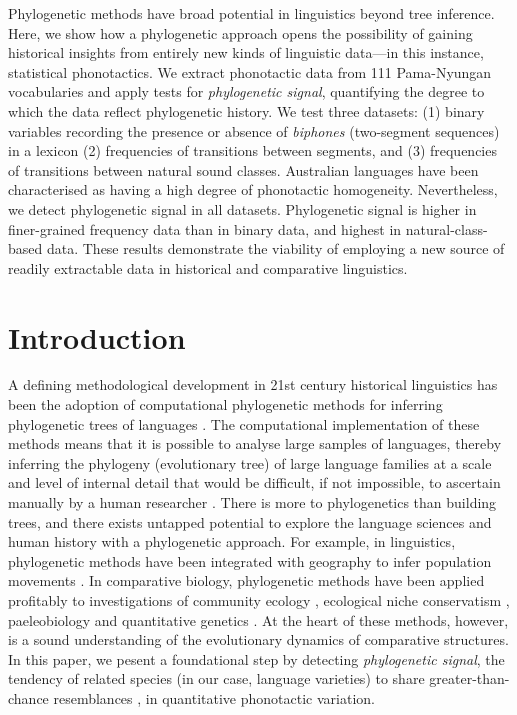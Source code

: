 Phylogenetic methods have broad potential in linguistics beyond tree inference. Here, we show how a phylogenetic approach opens the possibility of gaining historical insights from entirely new kinds of linguistic data---in this instance, statistical phonotactics. We extract phonotactic data from 111 Pama-Nyungan vocabularies and apply tests for \emph{phylogenetic signal}, quantifying the degree to which the data reflect phylogenetic history. We test three datasets: (1) binary variables recording the presence or absence of \emph{biphones} (two-segment sequences) in a lexicon (2) frequencies of transitions between segments, and (3) frequencies of transitions between natural sound classes. Australian languages have been characterised as having a high degree of phonotactic homogeneity. Nevertheless, we detect phylogenetic signal in all datasets. Phylogenetic signal is higher in finer-grained frequency data than in binary data, and highest in natural-class-based data. These results demonstrate the viability of employing a new source of readily extractable data in historical and comparative linguistics.

\hypertarget{phy-sig-intro}{%
\section{Introduction}\label{phy-sig-intro}}

A defining methodological development in 21st century historical linguistics has been the adoption of computational phylogenetic methods for inferring phylogenetic trees of languages \autocite{bowern_computational_2018}. The computational implementation of these methods means that it is possible to analyse large samples of languages, thereby inferring the phylogeny (evolutionary tree) of large language families at a scale and level of internal detail that would be difficult, if not impossible, to ascertain manually by a human researcher \autocite[p.~827]{bowern_computational_2012}. There is more to phylogenetics than building trees, and there exists untapped potential to explore the language sciences and human history with a phylogenetic approach. For example, in linguistics, phylogenetic methods have been integrated with geography to infer population movements \autocites{walker_bayesian_2011}{bouckaert_origin_2018}. In comparative biology, phylogenetic methods have been applied profitably to investigations of community ecology \autocite{webb_phylogenies_2002}, ecological niche conservatism \autocite{losos_phylogenetic_2008}, paeleobiology \autocite{sallan_heads_2012} and quantitative genetics \autocite{de_villemereuil_general_2014}. At the heart of these methods, however, is a sound understanding of the evolutionary dynamics of comparative structures. In this paper, we pesent a foundational step by detecting \emph{phylogenetic signal}, the tendency of related species (in our case, language varieties) to share greater-than-chance resemblances \autocite{blomberg_tempo_2002}, in quantitative phonotactic variation.

